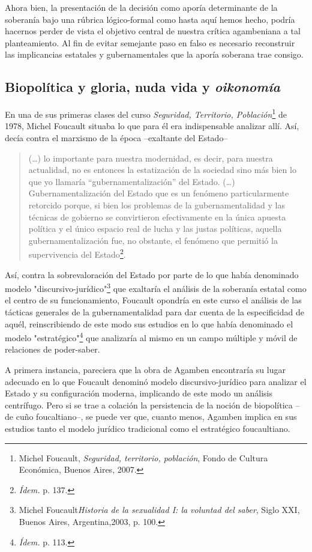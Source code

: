 Ahora bien, la presentación de la decisión como aporía determinante de
la soberanía bajo una rúbrica lógico-formal como hasta aquí hemos hecho,
podría hacernos perder de vista el objetivo central de nuestra crítica
agambeniana a tal planteamiento. Al fin de evitar semejante paso en
falso es necesario reconstruir las implicancias estatales y
gubernamentales que la aporía soberana trae consigo.

\subsection{Biopolítica y gloria, nuda vida y \emph{oikonomía}}

En una de sus primeras clases del curso \emph{Seguridad, Territorio,
Población}\footnote{Michel Foucault, \emph{Seguridad, territorio,
  población}, Fondo de Cultura Económica, Buenos Aires, 2007.} de 1978,
Michel Foucault situaba lo que para él era indispensable analizar allí.
Así, decía contra el marxismo de la época --exaltante del Estado--

\begin{quote}
(\dots) lo importante para nuestra modernidad, es decir, para
nuestra actualidad, no es entonces la estatización de la sociedad sino
más bien lo que yo llamaría ``gubernamentalización'' del Estado.
(\dots) Gubernamentalización del Estado que es un fenómeno
particularmente retorcido porque, si bien los problemas de la
gubernamentalidad y las técnicas de gobierno se convirtieron
efectivamente en la única apuesta política y el único espacio real de
lucha y las justas políticas, aquella gubernamentalización fue, no
obstante, el fenómeno que permitió la supervivencia del
Estado\footnote{\emph{Ídem.} p. 137.}.
\end{quote}

Así, contra la sobrevaloración del Estado por parte de lo que había
denominado modelo "discursivo-jurídico"\footnote{Michel
  Foucault\emph{Historia de la sexualidad I: la voluntad del saber},
  Siglo XXI, Buenos Aires, Argentina,2003, p. 100.} que exaltaría el
análisis de la soberanía estatal como el centro de su funcionamiento,
Foucault opondría en este curso el análisis de las tácticas generales de
la gubernamentalidad para dar cuenta de la especificidad de aquél,
reinscribiendo de este modo sus estudios en lo que había denominado el
modelo "estratégico"\footnote{\emph{Ídem.} p. 113.} que analizaría al
mismo en un campo múltiple y móvil de relaciones de poder-saber.

A primera instancia, pareciera que la obra de Agamben encontraría su
lugar adecuado en lo que Foucault denominó modelo discursivo-jurídico
para analizar el Estado y su configuración moderna, implicando de este
modo un análisis centrífugo. Pero si se trae a colación la persistencia
de la noción de biopolítica --de cuño foucaltiano--, se puede ver que,
cuanto menos, Agamben implica en sus estudios tanto el modelo jurídico
tradicional como el estratégico foucaultiano.

